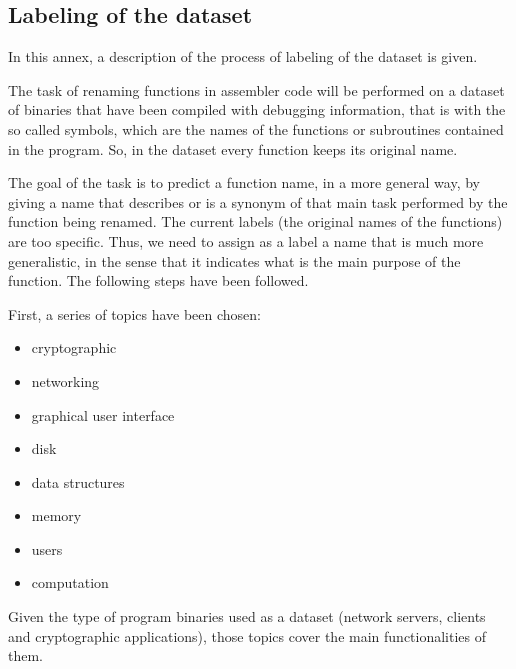 \begin{appendices}
\section{Labeling of the dataset}\label{annex:labels}


In this annex, a description of the process of labeling of the dataset is given.

The task of renaming functions in assembler code will be performed on a dataset of binaries that have been compiled with debugging information, that is with the so called symbols, which are the names of the functions or subroutines contained in the program. So, in the dataset every function keeps its original name.


The goal of the task is to predict a function name, in a more general way, by giving a name that describes or is a synonym of that main task performed by the function being renamed.  The current labels (the original names of the functions) are too specific. Thus, we need to assign as a label a name that is much more generalistic, in the sense that it indicates what is the main purpose of the function. The following steps have been followed.

First, a series of topics have been chosen:
\begin{itemize}
\item cryptographic
\item networking
\item graphical user interface
\item disk
\item data structures
\item memory
\item users
\item computation
\end{itemize}

Given the type of program binaries used as a dataset (network servers, clients and cryptographic applications), those topics cover the main functionalities of them.


\end{appendices}
